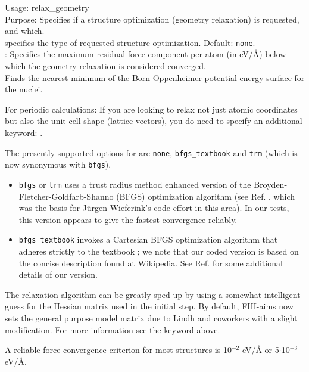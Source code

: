 {
  \noindent
  Usage: relax\_geometry   \\[1.0ex]
  Purpose: Specifies if a structure optimization (geometry relaxation)
    is requested, and which. \\[1.0ex]
   specifies the type of requested structure
    optimization. Default: \texttt{none}. \\
  : Specifies the maximum residual
    force component per atom (in eV/{\AA}) below which the geometry
    relaxation is considered converged. \\
}
Finds the nearest minimum of the Born-Oppenheimer potential energy
surface for the nuclei.

For periodic calculations: If you are looking to relax not just atomic
coordinates but also the unit cell shape (lattice vectors), you do
need to specify an additional keyword: .

The presently supported options for  are \texttt{none},
\texttt{bfgs\_textbook} and \texttt{trm} (which is now synonymous with
\texttt{bfgs}).
\begin{itemize}
  \item \texttt{bfgs} or \texttt{trm} uses a trust radius method enhanced
    version of the Broyden-Fletcher-Goldfarb-Shanno (BFGS) optimization
    algorithm (see Ref. \cite{Nocedal06-numopt}, which was the basis for
    J\"urgen Wieferink's code effort in this area). In our tests, this version
    appears to give the fastest convergence reliably.
  \item \texttt{bfgs\_textbook} invokes a Cartesian BFGS optimization algorithm
    that adheres strictly to the textbook \cite{NumericalRecipes}; we note that
    our coded version is based on the concise description found at Wikipedia.
    See Ref. \cite{Blum08} for some additional details of our version.
\end{itemize}

The relaxation algorithm can be greatly sped up by using a somewhat
intelligent guess for the Hessian matrix used in the initial step. 
By default, FHI-aims now sets the general purpose model matrix due to Lindh
and coworkers \cite{Lin95} with a slight modification. For more information
see the  keyword above.

A reliable force convergence criterion  for most
structures is 10$^{-2}$ eV/{\AA} or 5$\cdot$10$^{-3}$ eV/{\AA}.  

